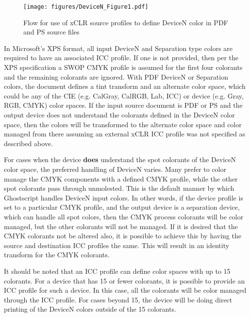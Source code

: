 \documentclass[12pt,notitlepage]{article}
\begin{document}
\begin{figure}
    \begin{center}
\texttt{[image: figures/DeviceN\_Figure1.pdf]}
    \end{center}
   \caption{Flow for use of xCLR source profiles to define DeviceN color in PDF and PS source files }
    \label{fig:DeviceN}
\end{figure}

In Microsoft's XPS format, all input DeviceN and Separation type colors are required to have an associated ICC profile.  If one is not provided, then per the XPS specification\cite{XPS} a SWOP CMYK profile is assumed for the first four colorants and the remaining colorants are ignored. With PDF DeviceN or Separation colors, the document defines a tint transform and an alternate color space, which could be any of the CIE (e.g. CalGray, CalRGB, Lab, ICC) or device (e.g. Gray, RGB, CMYK) color spaces.  If the input source document is PDF or PS and the output device does not understand the colorants defined in the DeviceN color space, then the colors will be transformed to the alternate color space and color managed from there assuming an external xCLR ICC profile was not specified as described above.

For cases when the device {\bf does} understand the spot colorants of the DeviceN color space, the preferred handling of DeviceN varies.  Many prefer to color manage the CMYK components with a defined CMYK profile, while the other spot colorants pass through unmolested. This is the default manner by which Ghostscript handles DeviceN input colors.  In other words, if the device profile is set to a particular CMYK profile, and the output device is a separation device, which can handle all spot colors, then the CMYK process colorants will be color managed, but the other colorants will not be managed.  If it is desired that the CMYK colorants not be altered also, it is possible to achieve this by having the source and destination ICC profiles the same.  This will result in an identity transform for the CMYK colorants.

It should be noted that an ICC profile can define color spaces with up to 15 colorants.  For a device that has 15 or fewer colorants, it is possible to provide an ICC profile for such a device.  In this case, all the colorants will be color managed through the ICC profile.  For cases beyond 15, the device will be doing direct printing of the DeviceN colors outside of the 15 colorants.
\end{document}
